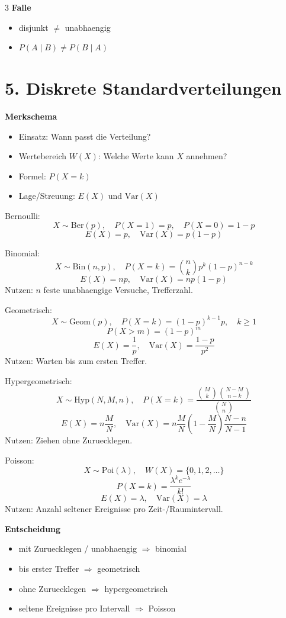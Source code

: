 \documentclass[a4paper,8pt,landscape]{article}
\newcommand{\Var}{\mathrm{Var}}
\newcommand{\Bin}{\mathrm{Bin}}
\newcommand{\Geom}{\mathrm{Geom}}
\newcommand{\Hyp}{\mathrm{Hyp}}
\newcommand{\Ber}{\mathrm{Ber}}
\begin{document}
\begin{multicols*}{3}
\textbf{Falle}
\begin{itemize}
  \item disjunkt $\neq$ unabhaengig
  \item $P(A\mid B)\neq P(B\mid A)$
\end{itemize}

\section*{5. Diskrete Standardverteilungen}
\textbf{Merkschema}
\begin{itemize}
  \item Einsatz: Wann passt die Verteilung?
  \item Wertebereich $W(X)$: Welche Werte kann $X$ annehmen?
  \item Formel: $P(X=k)$
  \item Lage/Streuung: $E(X)$ und $\Var(X)$
\end{itemize}

Bernoulli:
\[
X\sim\Ber(p),\quad P(X=1)=p,\quad P(X=0)=1-p
\]
\[
E(X)=p,\quad \Var(X)=p(1-p)
\]

Binomial:
\[
X\sim\Bin(n,p),\quad P(X=k)=\binom{n}{k}p^k(1-p)^{n-k}
\]
\[
E(X)=np,\quad \Var(X)=np(1-p)
\]
Nutzen: $n$ feste unabhaengige Versuche, Trefferzahl.

Geometrisch:
\[
X\sim\Geom(p),\quad P(X=k)=(1-p)^{k-1}p,\quad k\ge 1
\]
\[
P(X>m)=(1-p)^m
\]
\[
E(X)=\frac{1}{p},\quad \Var(X)=\frac{1-p}{p^2}
\]
Nutzen: Warten bis zum ersten Treffer.

Hypergeometrisch:
\[
X\sim\Hyp(N,M,n),\quad P(X=k)=\frac{\binom{M}{k}\binom{N-M}{n-k}}{\binom{N}{n}}
\]
\[
E(X)=n\frac{M}{N},\quad \Var(X)=n\frac{M}{N}\left(1-\frac{M}{N}\right)\frac{N-n}{N-1}
\]
Nutzen: Ziehen ohne Zuruecklegen.

Poisson:
\[
X\sim\mathrm{Poi}(\lambda),\quad W(X)=\{0,1,2,\dots\}
\]
\[
P(X=k)=\frac{\lambda^k e^{-\lambda}}{k!}
\]
\[
E(X)=\lambda,\quad \Var(X)=\lambda
\]
Nutzen: Anzahl seltener Ereignisse pro Zeit-/Raumintervall.

\textbf{Entscheidung}
\begin{itemize}
  \item mit Zuruecklegen / unabhaengig $\Rightarrow$ binomial
  \item bis erster Treffer $\Rightarrow$ geometrisch
  \item ohne Zuruecklegen $\Rightarrow$ hypergeometrisch
  \item seltene Ereignisse pro Intervall $\Rightarrow$ Poisson
\end{itemize}


\end{multicols*}
\end{document}
